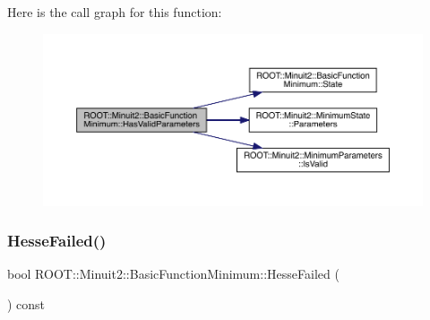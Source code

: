 Here is the call graph for this function\+:
\nopagebreak
\begin{figure}[H]
\begin{center}
\leavevmode
\includegraphics[width=350pt]{de/d25/classROOT_1_1Minuit2_1_1BasicFunctionMinimum_a91fedd04974dd5d27981eb758405670f_cgraph}
\end{center}
\end{figure}
\mbox{\label{classROOT_1_1Minuit2_1_1BasicFunctionMinimum_a8bcb47393d7e39ec1c8fda42974d092f}} 
\subsubsection{\texorpdfstring{HesseFailed()}{HesseFailed()}\hspace{0.1cm}{\footnotesize\ttfamily [1/3]}}
{\footnotesize\ttfamily bool R\+O\+O\+T\+::\+Minuit2\+::\+Basic\+Function\+Minimum\+::\+Hesse\+Failed (\begin{DoxyParamCaption}{ }\end{DoxyParamCaption}) const\hspace{0.3cm}{\ttfamily [inline]}}

